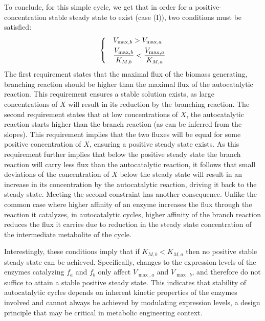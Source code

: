     To conclude, for this simple cycle, we get that in order for a positive-concentration stable steady state to exist (case (I)), two conditions must be satisfied:
    \begin{equation}
    \label{eq:stabconds}
    \begin{dcases}
      & V_{\max,b}>V_{\max,a} \\
      & \frac{V_{\max,b}}{K_{M,b}}<\frac{V_{\max,a}}{K_{M,a}}
    \end{dcases}
    \end{equation}
    The first requirement states that the maximal flux of the biomass generating, branching reaction should be higher than the maximal flux of the autocatalytic reaction.
    This requirement ensures a stable solution exists, as large concentrations of $X$ will result in its reduction by the branching reaction.
    The second requirement states that at low concentrations of $X$, the autocatalytic reaction starts higher than the branch reaction (as can be inferred from the slopes).
    This requirement implies that the two fluxes will be equal for some positive concentration of $X$, ensuring a positive steady state exists.
    As this requirement further implies that below the positive steady state the branch reaction will carry less flux than the autocatalytic reaction, it follows that small deviations of the concentration of $X$ below the steady state will result in an increase in its concentration by the autocatalytic reaction, driving it back to the steady state.
    Meeting the second constraint has another consequence.
    Unlike the common case where higher affinity of an enzyme increases the flux through the reaction it catalyzes, in autocatalytic cycles, higher affinity of the branch reaction reduces the flux it carries due to reduction in the steady state concentration of the intermediate metabolite of the cycle.

    Interestingly, these conditions imply that if $K_{M,b}<K_{M,a}$ then no positive stable steady state can be achieved.
    Specifically, changes to the expression levels of the enzymes catalyzing $f_a$ and $f_b$ only affect $V_{\max,a}$ and $V_{\max,b}$, and therefore do not suffice to attain a stable positive steady state.
    This indicates that stability of autocatalytic cycles depends on inherent kinetic properties of the enzymes involved and cannot always be achieved by modulating expression levels, a design principle that may be critical in metabolic engineering context.

